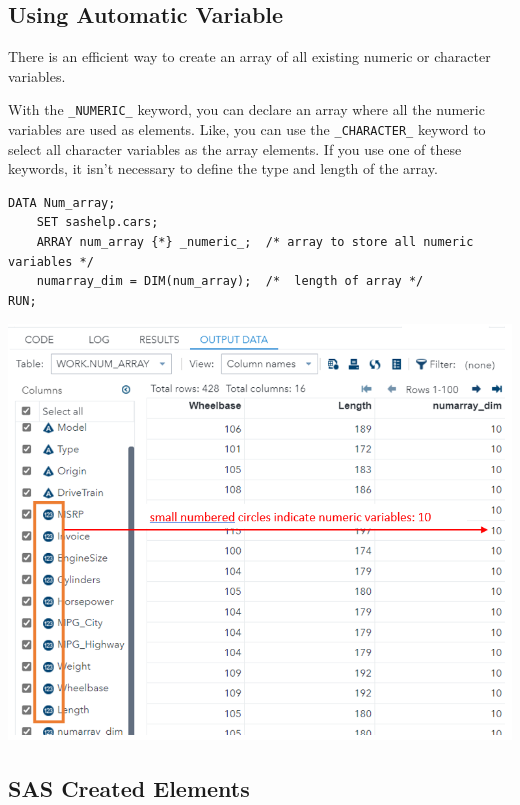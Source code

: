 \documentclass[
]{book}
\begin{document}
\hypertarget{using-automatic-variable}{%
\subsection{Using Automatic Variable}\label{using-automatic-variable}}

There is an efficient way to create an array of all existing numeric or character variables.

With the \texttt{\_NUMERIC\_} keyword, you can declare an array where all the numeric variables are used as elements. Like, you can use the \texttt{\_CHARACTER\_} keyword to select all character variables as the array elements. If you use one of these keywords, it isn't necessary to define the type and length of the array.

\begin{verbatim}
DATA Num_array;
    SET sashelp.cars;
    ARRAY num_array {*} _numeric_;  /* array to store all numeric variables */
    numarray_dim = DIM(num_array);  /*  length of array */
RUN;
\end{verbatim}

\begin{center}\includegraphics[width=1\linewidth]{img11/w11-NumArraySize} \end{center}

\hypertarget{sas-created-elements}{%
\subsection{SAS Created Elements}\label{sas-created-elements}}
\end{document}
